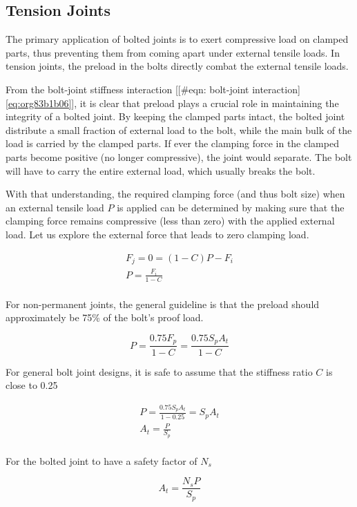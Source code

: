 \documentclass[a4paper,openany,12pt]{book}
\begin{document}
{{\subsection{Tension Joints}
\label{sec:orgb4cbec6}
The primary application of bolted joints is to exert compressive load on
clamped parts, thus preventing them from coming apart under external
tensile loads. In tension joints, the preload in the bolts directly
combat the external tensile loads.

From the bolt-joint stiffness interaction
[[\#eqn: bolt-joint interaction]\ref{eq:org83b1b06}], it is
clear that preload plays a crucial role in maintaining the integrity of
a bolted joint. By keeping the clamped parts intact, the bolted joint
distribute a small fraction of external load to the bolt, while the main
bulk of the load is carried by the clamped parts. If ever the clamping
force in the clamped parts become positive (no longer compressive), the
joint would separate. The bolt will have to carry the entire external
load, which usually breaks the bolt.

With that understanding, the required clamping force (and thus bolt
size) when an external tensile load \(P\) is applied can be determined by
making sure that the clamping force remains compressive (less than zero)
with the applied external load. Let us explore the external force that
leads to zero clamping load.

$$\begin{gathered}
  F_j = 0 = (1 - C)P - F_i \\ 
  P = \frac{F_i}{1 - C} \\ 
\end{gathered}$$

For non-permanent joints, the general guideline is that the preload
should approximately be 75\% of the bolt's proof load.

$$P = \frac{0.75F_p}{1 - C} = \frac{0.75S_pA_t}{1 - C}$$

For general bolt joint designs, it is safe to assume that the stiffness
ratio \(C\) is close to 0.25

$$\begin{gathered}
  P = \frac{0.75S_pA_t}{1 - 0.25} = S_pA_t \\ 
  A_t = \frac{P}{S_p} \\ 
\end{gathered}$$

For the bolted joint to have a safety factor of \(N_s\)

$$\label{eqn: tension joint bolt sizing}
  A_t = \frac{N_sP}{S_p}$$

}}
\end{document}
